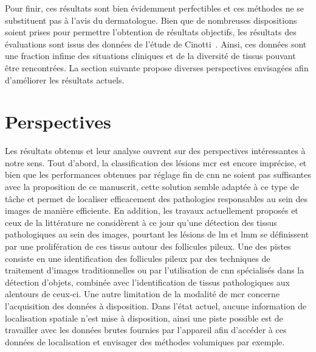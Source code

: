Pour finir, ces résultats sont bien évidemment perfectibles et ces méthodes ne se substituent pas à l'avis du dermatologue. Bien que de nombreuses dispositions soient prises pour permettre l'obtention de résultats objectifs, les résultats des évaluations sont issus des données de l'étude de Cinotti~. Ainsi, ces données sont une fraction infime des situations cliniques et de la diversité de tissus pouvant être rencontrées. La section suivante propose diverses perspectives envisagées afin d'améliorer les résultats actuels.\par
\clearpage

\section*{Perspectives}
Les résultats obtenus et leur analyse ouvrent sur des perspectives intéressantes à notre sens. Tout d'abord, la classification des lésions \gls{mcr} est encore imprécise, et bien que les performances obtenues par réglage fin de \gls{cnn} ne soient pas suffisantes avec la proposition de ce manuscrit, cette solution semble adaptée à ce type de tâche et permet de localiser efficacement des pathologies responsables au sein des images de manière efficiente. En addition, les travaux actuellement proposés et ceux de la littérature ne considèrent à ce jour qu'une détection des tissus pathologiques au sein des images, pourtant les lésions de \gls{lm} et \gls{lmm} se définissent par une prolifération de ces tissus autour des follicules pileux. Une des pistes consiste en une identification des follicules pileux par des techniques de traitement d'images traditionnelles ou par l'utilisation de \gls{cnn} spécialisés dans la détection d'objets, combinée avec l'identification de tissus pathologiques aux alentours de ceux-ci. Une autre limitation de la modalité de \gls{mcr} concerne l'acquisition des données à disposition. Dans l'état actuel, aucune information de localisation spatiale n'est mise à disposition, ainsi une piste possible est de travailler avec les données brutes fournies par l'appareil afin d'accéder à ces données de localisation et envisager des méthodes volumiques par exemple.\par

